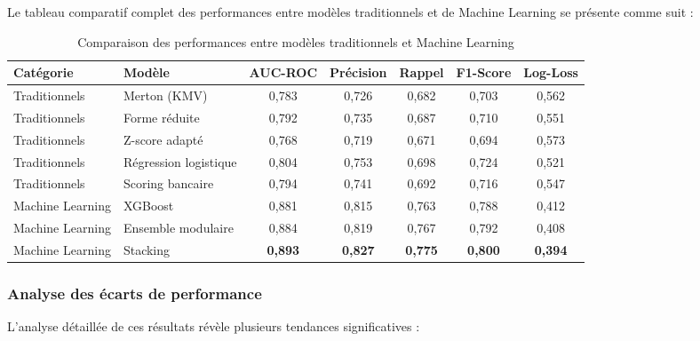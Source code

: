 Le tableau comparatif complet des performances entre modèles traditionnels et de Machine Learning se présente comme suit :

\begin{table}[htbp]
  \centering
  \caption{Comparaison des performances entre modèles traditionnels et Machine Learning}
  \begin{tabular}{llccccc}
    \toprule
    \textbf{Catégorie} & \textbf{Modèle} & \textbf{AUC-ROC} & \textbf{Précision} & \textbf{Rappel} & \textbf{F1-Score} & \textbf{Log-Loss} \\
    \midrule
    Traditionnels & Merton (KMV) & 0,783 & 0,726 & 0,682 & 0,703 & 0,562 \\
    Traditionnels & Forme réduite & 0,792 & 0,735 & 0,687 & 0,710 & 0,551 \\
    Traditionnels & Z-score adapté & 0,768 & 0,719 & 0,671 & 0,694 & 0,573 \\
    Traditionnels & Régression logistique & 0,804 & 0,753 & 0,698 & 0,724 & 0,521 \\
    Traditionnels & Scoring bancaire & 0,794 & 0,741 & 0,692 & 0,716 & 0,547 \\
    Machine Learning & XGBoost & 0,881 & 0,815 & 0,763 & 0,788 & 0,412 \\
    Machine Learning & Ensemble modulaire & 0,884 & 0,819 & 0,767 & 0,792 & 0,408 \\
    Machine Learning & Stacking & \textbf{0,893} & \textbf{0,827} & \textbf{0,775} & \textbf{0,800} & \textbf{0,394} \\
    \bottomrule
  \end{tabular}
\end{table}

\subsubsection{Analyse des écarts de performance}

L'analyse détaillée de ces résultats révèle plusieurs tendances significatives :

